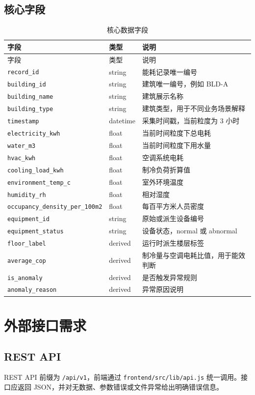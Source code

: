 \documentclass[12pt,a4paper]{ctexart}
\newcommand{\code}[1]{{\footnotesize\nolinkurl{#1}}}
\begin{document}
\subsection{核心字段}
\begin{longtable}{p{3.7cm}p{2.2cm}p{7.6cm}}
\caption{核心数据字段}\\
\toprule
字段 & 类型 & 说明 \\
\midrule
\endfirsthead
\toprule
字段 & 类型 & 说明 \\
\midrule
\endhead
\code{record_id} & string & 能耗记录唯一编号 \\
\code{building_id} & string & 建筑唯一编号，例如 BLD-A \\
\code{building_name} & string & 建筑展示名称 \\
\code{building_type} & string & 建筑类型，用于不同业务场景解释 \\
\code{timestamp} & datetime & 采集时间戳，当前粒度为 3 小时 \\
\code{electricity_kwh} & float & 当前时间粒度下总电耗 \\
\code{water_m3} & float & 当前时间粒度下用水量 \\
\code{hvac_kwh} & float & 空调系统电耗 \\
\code{cooling_load_kwh} & float & 制冷负荷折算值 \\
\code{environment_temp_c} & float & 室外环境温度 \\
\code{humidity_rh} & float & 相对湿度 \\
\code{occupancy_density_per_100m2} & float & 每百平方米人员密度 \\
\code{equipment_id} & string & 原始或派生设备编号 \\
\code{equipment_status} & string & 设备状态，normal 或 abnormal \\
\code{floor_label} & derived & 运行时派生楼层标签 \\
\code{average_cop} & derived & 制冷量与空调电耗比值，用于能效判断 \\
\code{is_anomaly} & derived & 是否触发异常规则 \\
\code{anomaly_reason} & derived & 异常原因说明 \\
\bottomrule
\end{longtable}

\section{外部接口需求}
\subsection{REST API}
REST API 前缀为 \code{/api/v1}，前端通过 \code{frontend/src/lib/api.js} 统一调用。接口应返回 JSON，并对无数据、参数错误或文件异常给出明确错误信息。
\end{document}
